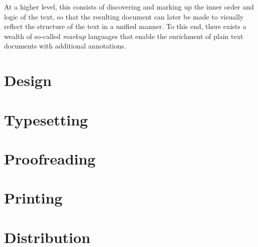 \documentclass{book}
\begin{document}
      At a higher level, this consists of discovering and marking up the inner
      order and logic of the text, so that the resulting document can later be
      made to visually reflect the structure of the text in a unified manner. To
      this end, there exists a wealth of so-called \emph{markup} languages that
      enable the enrichment of plain text documents with additional annotations.

    \chapter{Design}
    \chapter{Typesetting}
    \chapter{Proofreading}
    \chapter{Printing}
    \chapter{Distribution}
\end{document}
